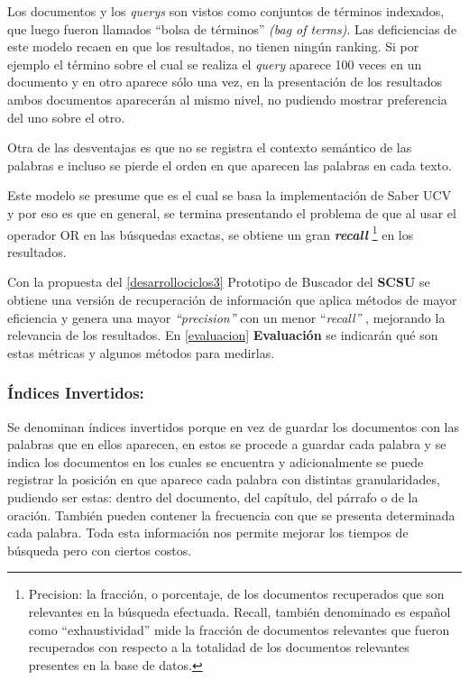 \documentclass[
  12pt,
  openany]{book}
\begin{document}
Los documentos y los \emph{querys} son vistos como conjuntos de términos indexados, que luego fueron llamados ``bolsa de términos'' \emph{(bag of terms)}. Las deficiencias de este modelo recaen en que los resultados, no tienen ningún ranking. Si por ejemplo el término sobre el cual se realiza el \emph{query} aparece 100 veces en un documento y en otro aparece sólo una vez, en la presentación de los resultados ambos documentos aparecerán al mismo nivel, no pudiendo mostrar preferencia del uno sobre el otro.

Otra de las desventajas es que no se registra el contexto semántico de las palabras e incluso se pierde el orden en que aparecen las palabras en cada texto.

Este modelo se presume que es el cual se basa la implementación de Saber UCV y por eso es que en general, se termina presentando el problema de que al usar el operador OR en las búsquedas exactas, se obtiene un gran \textbf{\emph{recall}} \footnote{Precision: la fracción, o porcentaje, de los documentos recuperados que son relevantes en la búsqueda efectuada. Recall, también denominado es español como ``exhaustividad'' mide la fracción de documentos relevantes que fueron recuperados con respecto a la totalidad de los documentos relevantes presentes en la base de datos.} en los resultados.

Con la propuesta del \ref{desarrollociclos3} Prototipo de Buscador del \textbf{SCSU} se obtiene una versión de recuperación de información que aplica métodos de mayor eficiencia y genera una mayor \emph{``precision''} con un menor ``\emph{recall''} , mejorando la relevancia de los resultados. En \ref{evaluacion} \textbf{Evaluación} se indicarán qué son estas métricas y algunos métodos para medirlas.

\hypertarget{invind}{%
\subsubsection{Índices Invertidos:}\label{invind}}

Se denominan índices invertidos porque en vez de guardar los documentos con las palabras que en ellos aparecen, en estos se procede a guardar cada palabra y se indica los documentos en los cuales se encuentra y adicionalmente se puede registrar la posición en que aparece cada palabra con distintas granularidades, pudiendo ser estas: dentro del documento, del capítulo, del párrafo o de la oración. También pueden contener la frecuencia con que se presenta determinada cada palabra. Toda esta información nos permite mejorar los tiempos de búsqueda pero con ciertos costos.
\end{document}
